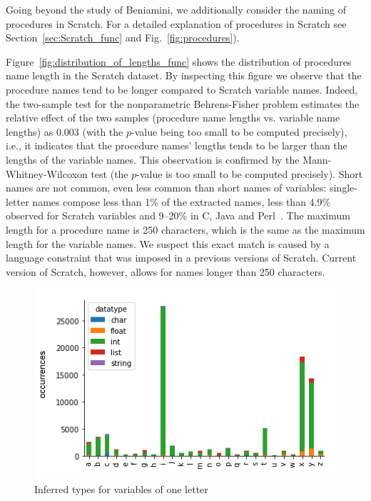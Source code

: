 \documentclass[conference]{IEEEtran}
\begin{document}
Going beyond the study of Beniamini, we additionally consider the naming of procedures in Scratch. 
For a detailed explanation of procedures in Scratch see Section~\ref{sec:Scratch_func} and Fig.~\ref{fig:procedures}).  

Figure~\ref{fig:distribution_of_lengths_func} shows the distribution of procedures name length in the Scratch dataset. 
By inspecting this figure we observe that the procedure names tend to be longer compared to Scratch variable names. 
Indeed, the two-sample test for the nonparametric Behrens-Fisher problem estimates the relative effect of the two samples (procedure name lengths vs. variable name lengths) as $0.003$ (with the $p$-value being too small to be computed precisely), i.e., it indicates that the procedure names' lengths tends to be larger than the lengths of the variable names. 
This observation is confirmed by the Mann-Whitney-Wilcoxon test (the $p$-value is too small to be computed precisely).
Short names are not common, even less common than short names of variables: single-letter names compose less than 1\% of the extracted names, less than 4.9\% observed for Scratch variables and 9--20\% in C, Java and Perl~\cite{Beniamini}. 
The maximum length for a procedure name is 250 characters, which is the same as the maximum length for the variable names. 
We suspect this exact match is caused by a language constraint that was imposed in a previous versions of Scratch. 
Current version of Scratch, however, allows for names longer than 250 characters. 
\begin{figure}[!b]
	\begin{center}
		\includegraphics[width=\columnwidth]{fig/singleletter_type_occurrences}
		\caption{Inferred types for variables of one letter}
		\label{fig:one_letter_type}
	\end{center}
\end{figure} 
\end{document}

